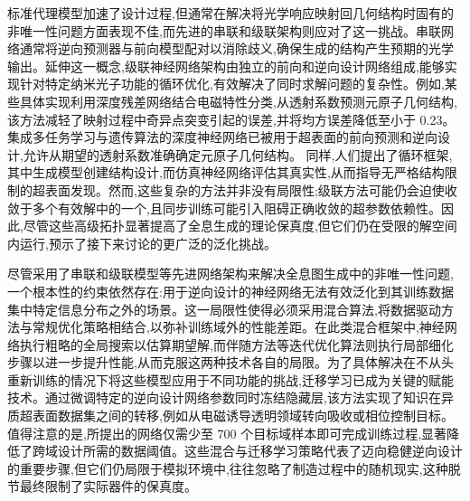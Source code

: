 \documentclass[11pt]{article}
\begin{document}
标准代理模型加速了设计过程,但通常在解决将光学响应映射回几何结构时固有的非唯一性问题方面表现不佳,而先进的串联和级联架构则应对了这一挑战。串联网络通常将逆向预测器与前向模型配对以消除歧义,确保生成的结构产生预期的光学输出。延伸这一概念,级联神经网络架构由独立的前向和逆向设计网络组成,能够实现针对特定纳米光子功能的循环优化,有效解决了同时求解问题的复杂性。例如,某些具体实现利用深度残差网络结合电磁特性分类,从透射系数预测元原子几何结构,该方法减轻了映射过程中奇异点突变引起的误差,并将均方误差降低至小于 0.23。集成多任务学习与遗传算法的深度神经网络已被用于超表面的前向预测和逆向设计,允许从期望的透射系数准确确定元原子几何结构。\citep{doi_10_1016_j_rio_2026_100988_b00ee173} 同样,人们提出了循环框架,其中生成模型创建结构设计,而仿真神经网络评估其真实性,从而指导无严格结构限制的超表面发现。然而,这些复杂的方法并非没有局限性;级联方法可能仍会迫使收敛于多个有效解中的一个,且同步训练可能引入阻碍正确收敛的超参数依赖性。因此,尽管这些高级拓扑显著提高了全息生成的理论保真度,但它们仍在受限的解空间内运行,预示了接下来讨论的更广泛的泛化挑战。\citep{doi_10_1038_s41598_020_76400_y_aa62c15d} \citep{doi_10_1109_iccem60619_2024_10559188_c3199408}

尽管采用了串联和级联模型等先进网络架构来解决全息图生成中的非唯一性问题,一个根本性的约束依然存在:用于逆向设计的神经网络无法有效泛化到其训练数据集中特定信息分布之外的场景。这一局限性使得必须采用混合算法,将数据驱动方法与常规优化策略相结合,以弥补训练域外的性能差距。在此类混合框架中,神经网络执行粗略的全局搜索以估算期望解,而伴随方法等迭代优化算法则执行局部细化步骤以进一步提升性能,从而克服这两种技术各自的局限。为了具体解决在不从头重新训练的情况下将这些模型应用于不同功能的挑战,迁移学习已成为关键的赋能技术。通过微调特定的逆向设计网络参数同时冻结隐藏层,该方法实现了知识在异质超表面数据集之间的转移,例如从电磁诱导透明领域转向吸收或相位控制目标。\citep{doi_10_1364_ol_514212_108a4a7f} \citep{doi_10_1109_ieeeconf35879_2020_9330480_27bef614} 值得注意的是,所提出的网络仅需少至 700 个目标域样本即可完成训练过程,显著降低了跨域设计所需的数据阈值。这些混合与迁移学习策略代表了迈向稳健逆向设计的重要步骤,但它们仍局限于模拟环境中,往往忽略了制造过程中的随机现实,这种脱节最终限制了实际器件的保真度。\citep{doi_10_1021_acsphotonics_2c00968_06a2e96b} \citep{doi_10_1364_ol_514212_108a4a7f}
\end{document}
